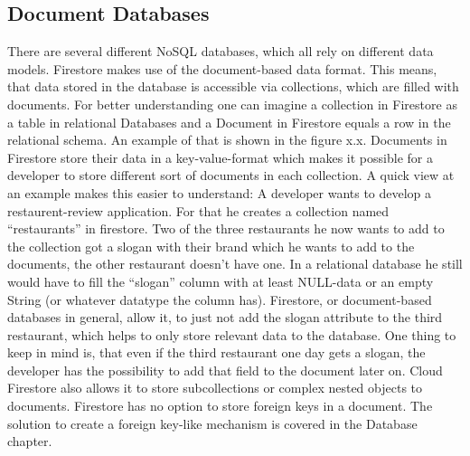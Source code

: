 \subsection{Document Databases}
There are several different NoSQL databases, which all rely on different data models. Firestore makes use of the document-based data format. This means, that data stored in the database is accessible via collections, which are filled with documents. For better understanding one can imagine a collection in Firestore as a table in relational Databases and a Document in Firestore equals a row in the relational schema. An example of that is shown in the figure x.x. Documents in Firestore store their data in a key-value-format which makes it possible for a developer to store different sort of documents in each collection. A quick view at an example makes this easier to understand: A developer wants to develop a restaurent-review application. For that he creates a collection named “restaurants” in firestore. Two of the three restaurants he now wants to add to the collection got a slogan with their brand which he wants to add to the documents, the other restaurant doesn’t have one. In a relational database he still would have to fill the “slogan” column with at least NULL-data or an empty String (or whatever datatype the column has). Firestore, or document-based databases in general, allow it, to just not add the slogan attribute to the third restaurant, which helps to only store relevant data to the database. One thing to keep in mind is, that even if the third restaurant one day gets a slogan, the developer has the possibility to add that field to the document later on. Cloud Firestore also allows it to store subcollections or complex nested objects to documents. Firestore has no option to store foreign keys in a document. The solution to create a foreign key-like mechanism is covered in the Database chapter. 
